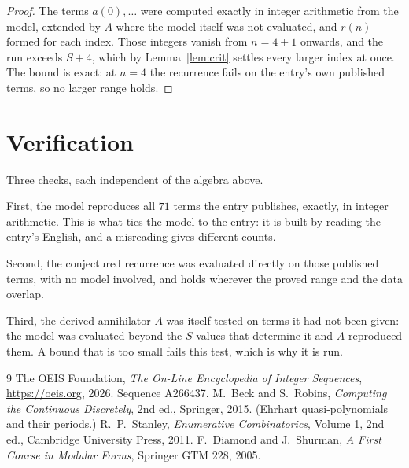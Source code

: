 \documentclass[11pt,a4paper]{article}
\theoremstyle{plain}
\theoremstyle{definition}
\begin{document}
\begin{proof}
The terms $a(0),\dots$ were computed exactly in integer arithmetic from the model, extended by
$A$ where the model itself was not evaluated, and $r(n)$ formed for each index. Those integers
vanish from $n=4+1$ onwards, and the run exceeds $S+4$, which by
Lemma~\ref{lem:crit} settles every larger index at once. The bound is exact: at $n=4$ the recurrence fails on the entry's own published terms, so no larger range holds.
\end{proof}

\section{Verification}

Three checks, each independent of the algebra above.

First, the model reproduces all $71$ terms the entry publishes, exactly, in integer
arithmetic. This is what ties the model to the entry: it is built by reading the entry's
English, and a misreading gives different counts.

Second, the conjectured recurrence was evaluated directly on those published terms, with no
model involved, and holds wherever the proved range and the data overlap.

Third, the derived annihilator $A$ was itself tested on terms it had not been given: the model
was evaluated beyond the $S$ values that determine it and $A$ reproduced them. A bound that is
too small fails this test, which is why it is run.

\begin{thebibliography}{9}
 The OEIS Foundation, \emph{The On-Line Encyclopedia of Integer
Sequences}, \url{https://oeis.org}, 2026. Sequence A266437.
 M.~Beck and S.~Robins, \emph{Computing the Continuous Discretely},
2nd ed., Springer, 2015. (Ehrhart quasi-polynomials and their periods.)
 R.~P.~Stanley, \emph{Enumerative Combinatorics}, Volume 1, 2nd ed.,
Cambridge University Press, 2011.
 F.~Diamond and J.~Shurman, \emph{A First Course in Modular Forms},
Springer GTM 228, 2005.
\end{thebibliography}
\end{document}
